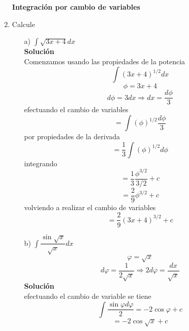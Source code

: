 \documentclass[10pt,twoside]{SelfArx} %
\begin{document}
\begin{enumerate}
\textbf{Integración por cambio de variables}\\

\item Calcule
\begin{enumerate}
	\item[a)] $ \displaystyle\int\sqrt{3x+4}dx $\\
	\textbf{Soluci\'on}\\
	Comenzamos usando las propiedades de la potencia
	\begin{equation}
	\int(3x+4)^{1/2}dx
	\end{equation}
	\[ \phi=3x+4 \]
	\[ d\phi=3dx\Rightarrow dx=\dfrac{d\phi}{3} \]
	efectuando el cambio de variables
	\begin{equation}
	=\int(\phi)^{1/2}\dfrac{d\phi}{3}
	\end{equation}
	por propiedades de la derivada
	\begin{equation}
	=\dfrac{1}{3}\int(\phi)^{1/2}d\phi
	\end{equation}
	integrando
	\begin{equation}
	=\dfrac{1}{3} \dfrac{\phi^{3/2}}{3/2}+c 
	\end{equation}
	\begin{equation}
	=\dfrac{2}{9}\phi^{3/2}+c 
	\end{equation}
	volviendo a realizar el cambio de variables
	\begin{equation}
		=\dfrac{2}{9}(3x+4)^{3/2}+c
	\end{equation}
	
	\item[b)] $ \displaystyle\int \dfrac{\sin \sqrt{x}}{\sqrt{x}}dx $
	\[ \varphi=\sqrt{x} \]
	\[ d\varphi=\dfrac{1}{2\sqrt{x}} \Rightarrow 2d\varphi=\dfrac{dx}{\sqrt{x}}\]
	\textbf{Soluci\'on}\\
	efectuando el cambio de variable se tiene 
	\begin{equation}
	\int \dfrac{\sin \varphi d\varphi}{2}=-2\cos \varphi+c
	\end{equation}
	\begin{equation}
	=-2\cos \sqrt{x}+c
	\end{equation}
	

























\end{enumerate}
\end{enumerate}
\end{document}
